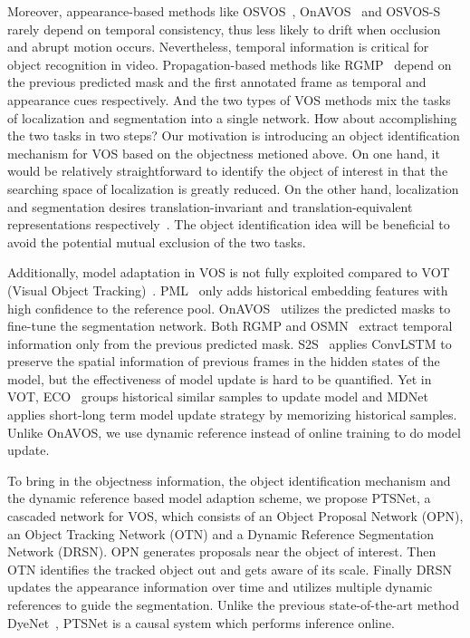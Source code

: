 \documentclass[10pt,twocolumn,letterpaper]{article}
\begin{document}
Moreover, appearance-based methods like OSVOS~\cite{osvos_cvpr17}, OnAVOS~\cite{onavos_bmvc17} and OSVOS-S~\cite{vos_wo_tempinfo_pami18} rarely depend on temporal consistency, thus less likely to drift when occlusion and abrupt motion occurs. Nevertheless, temporal information is critical for object recognition in video. Propagation-based methods like RGMP~\cite{rgmp_cvpr18} depend on the previous predicted mask and the first annotated frame as temporal and appearance cues respectively. And the two types of VOS methods mix the tasks of localization and segmentation into a single network. 
How about accomplishing the two tasks in two steps?  Our motivation is introducing an object identification mechanism for VOS based on the objectness metioned above. On one hand, it would be relatively straightforward to identify the object of interest in that the searching space of localization is greatly reduced. On the other hand, localization and segmentation desires translation-invariant and translation-equivalent representations respectively~\cite{mask_rcnn_oral_pdf_iccv17}. The object identification idea will be beneficial to avoid the potential mutual exclusion of the two tasks.

Additionally, model adaptation in VOS is not fully exploited compared to VOT (Visual Object Tracking)~\cite{vot_pami16}. PML~\cite{pml_cvpr18} only adds historical embedding features with high confidence to the reference pool. OnAVOS~\cite{onavos_bmvc17} utilizes the predicted masks to fine-tune the segmentation network. Both RGMP and OSMN~\cite{rgmp_cvpr18, Yang2018osmn} extract temporal information only from the previous predicted mask. S2S~\cite{yvos_eccv18} applies ConvLSTM to preserve the spatial information of previous frames in the hidden states of the model, but the effectiveness of model update is hard to be quantified. Yet in VOT, ECO~\cite{eco_cvpr17} groups historical similar samples to update model and MDNet~\cite{mdnet_cvpr16} applies short-long term model update strategy by memorizing historical samples. Unlike OnAVOS, we use dynamic reference instead of online training to do model update.









To bring in the objectness information, the object identification mechanism and the dynamic reference based model adaption scheme, we propose PTSNet, a cascaded network for VOS, which consists of an Object Proposal Network (OPN), an Object Tracking Network (OTN) and a Dynamic Reference Segmentation Network (DRSN). OPN generates proposals near the object of interest. Then OTN identifies the tracked object out and gets aware of its scale. Finally DRSN updates the appearance information over time and utilizes multiple dynamic references to guide the segmentation. Unlike the previous state-of-the-art method DyeNet~\cite{dyenet_eccv18}, PTSNet is a causal system which performs inference online.
\end{document}
